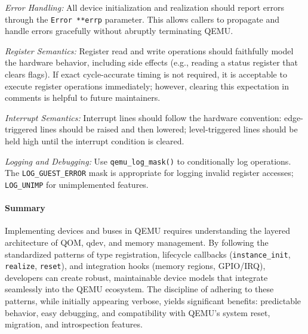 \textit{Error Handling:} All device initialization and realization should report errors through the \texttt{Error **errp} parameter. This allows callers to propagate and handle errors gracefully without abruptly terminating QEMU.

\textit{Register Semantics:} Register read and write operations should faithfully model the hardware behavior, including side effects (e.g., reading a status register that clears flags). If exact cycle-accurate timing is not required, it is acceptable to execute register operations immediately; however, clearing this expectation in comments is helpful to future maintainers.

\textit{Interrupt Semantics:} Interrupt lines should follow the hardware convention: edge-triggered lines should be raised and then lowered; level-triggered lines should be held high until the interrupt condition is cleared.

\textit{Logging and Debugging:} Use \texttt{qemu\_log\_mask()} to conditionally log operations. The \texttt{LOG\_GUEST\_ERROR} mask is appropriate for logging invalid register accesses; \texttt{LOG\_UNIMP} for unimplemented features.

\paragraph{Summary}

Implementing devices and buses in QEMU requires understanding the layered architecture of QOM, qdev, and memory management. By following the standardized patterns of type registration, lifecycle callbacks (\texttt{instance\_init}, \texttt{realize}, \texttt{reset}), and integration hooks (memory regions, GPIO/IRQ), developers can create robust, maintainable device models that integrate seamlessly into the QEMU ecosystem. The discipline of adhering to these patterns, while initially appearing verbose, yields significant benefits: predictable behavior, easy debugging, and compatibility with QEMU's system reset, migration, and introspection features.
